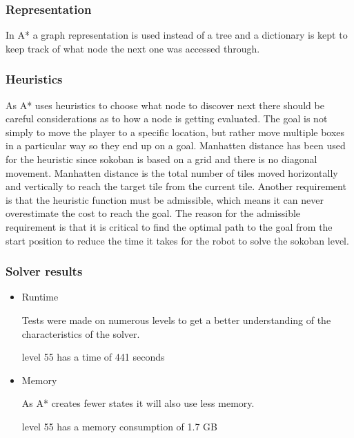\documentclass[../../maint.tex]{subfiles}
\begin{document}
\subsubsection{Representation}

In A* a graph representation is used instead of a tree and a dictionary is kept to keep track of what node the next one was accessed through.

\subsubsection{Heuristics}

As A* uses heuristics to choose what node to discover next there should be careful considerations as to how a node is 			getting evaluated. The goal is not simply to move the player to a specific location, but rather move multiple boxes in a particular way so they end up on a goal.
Manhatten distance has been used for the heuristic since sokoban is based on a grid and there is no diagonal movement. 			Manhatten distance is the total number of tiles moved horizontally and vertically to reach the target tile from the 			current tile. Another requirement is that the heuristic function must be admissible, which means it can never overestimate 	the cost to reach the goal. The reason for the admissible requirement is that it is critical to find the optimal path to the goal from the start position to reduce the time it takes for the robot to solve the sokoban level.

\subsubsection{Solver results}

 \begin{itemize}

	\item Runtime 		
 		
 	Tests were made on numerous levels to get a better understanding of the characteristics of the solver.
 		
 	level 55 has a time of 441 seconds
 		
	\item Memory
		
	As A* creates fewer states it will also use less memory. 
		
	level 55 has a memory consumption of 1.7 GB
		
 \end{itemize}
	
\end{document}
